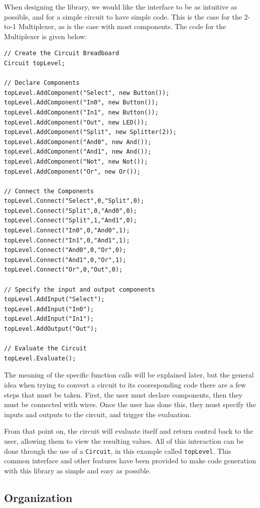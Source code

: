 \documentclass{article}
\newcommand{\ClassName}[1]{\texttt{#1}}
\begin{document}
When designing the library, we would like the interface to be as intuitive as possible, and for a simple circuit to have simple code. This is the case for the 2-to-1 Multiplexer, as is the case with most components. The code for the Multiplexer is given below:

\begin{lstlisting}
// Create the Circuit Breadboard
Circuit topLevel;

// Declare Components
topLevel.AddComponent("Select", new Button());
topLevel.AddComponent("In0", new Button());
topLevel.AddComponent("In1", new Button());
topLevel.AddComponent("Out", new LED());
topLevel.AddComponent("Split", new Splitter(2));
topLevel.AddComponent("And0", new And());
topLevel.AddComponent("And1", new And());
topLevel.AddComponent("Not", new Not());
topLevel.AddComponent("Or", new Or());

// Connect the Components
topLevel.Connect("Select",0,"Split",0);
topLevel.Connect("Split",0,"And0",0);
topLevel.Connect("Split",1,"And1",0);
topLevel.Connect("In0",0,"And0",1);
topLevel.Connect("In1",0,"And1",1);
topLevel.Connect("And0",0,"Or",0);
topLevel.Connect("And1",0,"Or",1);
topLevel.Connect("Or",0,"Out",0);

// Specify the input and output components
topLevel.AddInput("Select");
topLevel.AddInput("In0");
topLevel.AddInput("In1");
topLevel.AddOutput("Out");

// Evaluate the Circuit
topLevel.Evaluate();
\end{lstlisting}

The meaning of the specific function calls will be explained later, but the general idea when trying to convert a circuit to its cooresponding code there are a few steps that must be taken. First, the user must declare components, then they must be connected with wires. Once the user has done this, they must specify the inputs and outputs to the circuit, and trigger the evaluation.

From that point on, the circuit will evaluate itself and return control back to the user, allowing them to view the resulting values. All of this interaction can be done through the use of a \ClassName{Circuit}, in this example called \ClassName{topLevel}. This common interface and other features have been provided to make code generation with this library as simple and easy as possible.

\subsection{Organization}
\end{document}
